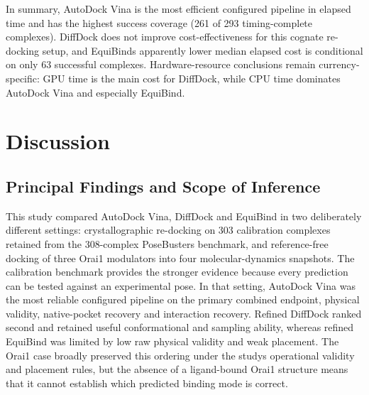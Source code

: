 In summary, AutoDock Vina is the most efficient configured pipeline in elapsed time and has the highest success coverage (261 of 293 timing-complete complexes). DiffDock does not improve cost-effectiveness for this cognate re-docking setup, and EquiBind\textquotesingle s apparently lower median elapsed cost is conditional on only 63 successful complexes. Hardware-resource conclusions remain currency-specific: GPU time is the main cost for DiffDock, while CPU time dominates AutoDock Vina and especially EquiBind.

\hypertarget{discussion}{%
\chapter{\texorpdfstring{Discussion }{Discussion }}\label{discussion}}

\hypertarget{principal-findings-and-scope-of-inference}{%
\section{Principal Findings and Scope of Inference}\label{principal-findings-and-scope-of-inference}}

This study compared AutoDock Vina, DiffDock and EquiBind in two deliberately different settings: crystallographic re-docking on 303 calibration complexes retained from the 308-complex PoseBusters benchmark, and reference-free docking of three Orai1 modulators into four molecular-dynamics snapshots. The calibration benchmark provides the stronger evidence because every prediction can be tested against an experimental pose. In that setting, AutoDock Vina was the most reliable configured pipeline on the primary combined endpoint, physical validity, native-pocket recovery and interaction recovery. Refined DiffDock ranked second and retained useful conformational and sampling ability, whereas refined EquiBind was limited by low raw physical validity and weak placement. The Orai1 case broadly preserved this ordering under the study\textquotesingle s operational validity and placement rules, but the absence of a ligand-bound Orai1 structure means that it cannot establish which predicted binding mode is correct.

